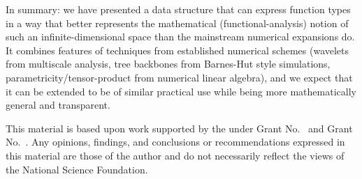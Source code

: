 \documentclass[final,sigplan,review,anonymous]{acmart}\settopmatter{printfolios=true,printccs=false,printacmref=false}
\theoremstyle{acmplain}
\theoremstyle{acmdefinition}
\begin{document}
In summary: we have presented a data structure that can express function types in a way that better represents the mathematical (functional-analysis) notion of such an infinite-dimensional space than the mainstream numerical expansions do.
It combines features of techniques from established numerical schemes (wavelets from multiscale analysis, tree backbones from Barnes-Hut style simulations, pa\-ra\-met\-ri\-ci\-ty/ten\-sor-pro\-duct from numerical linear algebra), and we expect that it can be extended to be of similar practical use while being more mathematically general and transparent.

\begin{acks}                            %
  This material is based upon work supported by the
   under Grant
  No.~ and Grant
  No.~.  Any opinions, findings, and
  conclusions or recommendations expressed in this material are those
  of the author and do not necessarily reflect the views of the
  National Science Foundation.
\end{acks}


%
\end{document}
